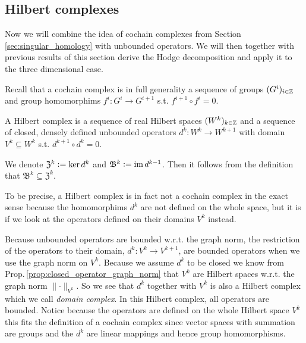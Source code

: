 \documentclass[../master_thesis.tex]{subfiles}
\begin{document}
\subsection{Hilbert complexes}\label{sec:hilbert_complexes_subsection}

Now we will combine the idea of cochain complexes from Section 
\ref{sec:singular_homology} 
with unbounded operators. We will then together with {\color{red} previous results} of
this section derive the Hodge decomposition and apply it to the three dimensional case.

Recall that a cochain complex 
is in full generality a sequence of groups $(G^i)_{i\in \mathbb{Z}}$ 
and group homomorphims $f^i: G^i \rightarrow G^{i+1}$ s.t. 
$f^{i+1} \circ f^{i} = 0$.

\begin{definition}
    A Hilbert complex is a sequence of real Hilbert spaces $(W^k)_{k\in \mathbb{Z}}$
    and a sequence of closed, densely defined 
    unbounded operators $d^k: W^k \rightarrow W^{k+1}$ with domain
    $V^k \subseteq W^k$ s.t. $d^{k+1} \circ d^k = 0$.
\end{definition}
\noindent We denote $\mathfrak{Z}^k  \vcentcolon= \ker d^k$ and $\mathfrak{B}^k 
\vcentcolon= \operatorname{im} d^{k-1}$. Then it follows from the definition that
$\mathfrak{B}^k \subseteq \mathfrak{Z}^k$. 

To be precise, a Hilbert complex is in fact not a cochain complex in the exact 
sense because the homomorphims $d^k$ are not defined on the whole space, but it is if we look at
the operators defined on their domains $V^k$ instead.

Because unbounded operators are bounded w.r.t. the graph norm,
the restriction of the operators to their domain,
$d^k: V^k \rightarrow V^{k+1}$, are bounded operators when we use the graph norm
on $V^k$. 
Because we assume $d^k$ to be 
closed we know from Prop.\,\ref{prop:closed_operator_graph_norm}
that $V^k$ are Hilbert spaces w.r.t. the graph norm $\lVert \cdot \rVert _{V^k}$.
So we see that $d^k$ together with $V^k$ is also a Hilbert complex which 
we call \textit{domain complex}. In this Hilbert complex, all operators are 
bounded. Notice because the operators are defined on the whole Hilbert space 
$V^k$ this fits the definition of a cochain complex since vector spaces 
with summation
are groups and the $d^k$ are linear mappings and hence group homomorphisms.
\end{document}
